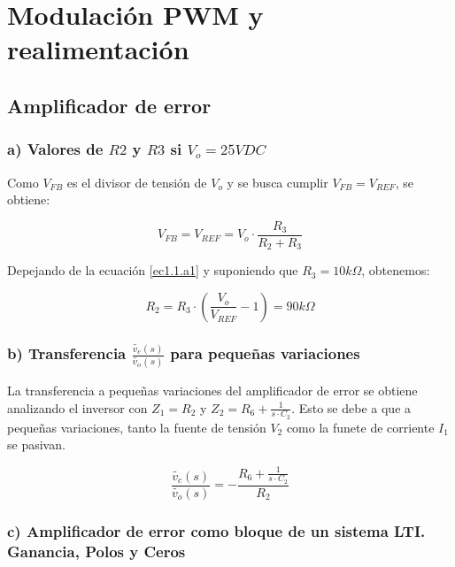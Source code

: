 \documentclass[e4_tp2_main.tex]{subfiles}
\begin{document}

\section{Modulación PWM y realimentación}

\subsection{Amplificador de error}

\subsubsection*{a) Valores de $R2$ y $R3$ si $V_o=25 VDC$}

Como $V_{FB}$ es el divisor de tensi\'on de $V_o$ y se busca cumplir $V_{FB}=V_{REF}$, se obtiene:

\begin{equation}
V_{FB}=V_{REF}= V_o \cdot \frac{R_3}{R_2+R_3} 
\label{ec1.1.a1}
\end{equation}


Depejando de la ecuaci\'on \eqref{ec1.1.a1} y suponiendo que $R_3=10k \Omega $, obtenemos:

\begin{equation}
R_2=R_3 \cdot \left( \frac{V_o}{V_{REF}} - 1 \right)=90k \Omega \label{ec1.1.a2}
\end{equation}

\subsubsection*{b) Transferencia  $\frac{ \widetilde{v_c}(s)}{\widetilde{v_o}(s)}$ para pequeñas variaciones} 

La transferencia a pequeñas variaciones del amplificador de error se obtiene analizando el inversor con $Z_1=R_2$ y $Z_2=R_6 + \frac{1}{s \cdot C_2}$. Esto se debe a que a pequeñas variaciones, tanto la fuente de tensi\'on $V_2$ como la funete de corriente $I_1$ se pasivan.

\begin{equation}
\frac{\widetilde{v_c}(s)}{\widetilde{v_o}(s)}=-\frac{R_6 + \frac{1}{s \cdot C_2} }{R_2}  \label{ec1.1.b}
\end{equation}

\subsubsection*{c) Amplificador de error como bloque de un sistema LTI. Ganancia, Polos y Ceros}
\end{document}
